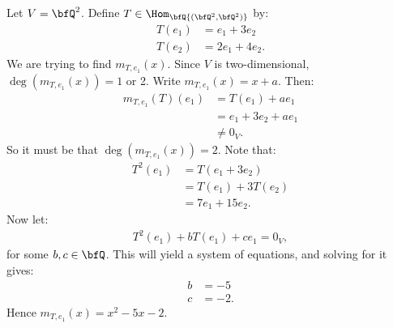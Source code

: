     \begin{example}
        Let $V = \bfQ^2$. Define $T \in \Hom_\bfQ{(\bfQ^2,\bfQ^2)}$ by:
            \begin{equation*}
            \begin{split}
                T(e_1) &= e_1 + 3e_2 \\
                T(e_2) &= 2e_1 + 4e_2.
            \end{split}
            \end{equation*}
        We are trying to find $m_{T,e_1}(x)$. Since $V$ is two-dimensional, $\deg(m_{T,e_1}(x)) = 1$ or 2. Write $m_{T,e_1}(x) = x +a$. Then:
            \begin{equation*}
            \begin{split}
                m_{T,e_1}(T)(e_1)
                & = T(e_1) + ae_1 \\
                & = e_1 + 3e_2 + ae_1 \\
                & \neq 0_V.
            \end{split}
            \end{equation*}
        So it must be that $\deg(m_{T,e_1}(x)) = 2$. Note that:
            \begin{equation*}
            \begin{split}
                T^2(e_1)
                & = T(e_1 + 3e_2) \\
                & = T(e_1) + 3T(e_2) \\
                & = 7e_1 + 15e_2.
            \end{split}
            \end{equation*}
        Now let:
            \begin{equation*}
            \begin{split}
                T^2(e_1) + bT(e_1) + ce_1 = 0_V,
            \end{split}
            \end{equation*}
        for some $b,c \in \bfQ$. This will yield a system of equations, and solving for it gives:
            \begin{equation*}
            \begin{split}
                b & = -5 \\
                c & = -2.
            \end{split}
            \end{equation*}
        Hence $m_{T,e_1}(x) = x^2 - 5x - 2$.
    \end{example}

